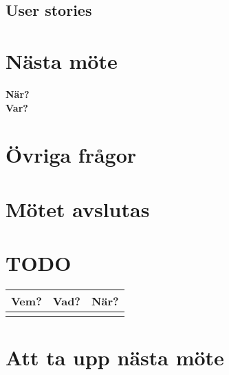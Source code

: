 \documentclass[9pt]{article}
\begin{document}
\subsection{User stories}

\section{Nästa möte}
\textbf{När?} \\
\textbf{Var?} \\

\section{Övriga frågor}

\section{Mötet avslutas}


\appendix
\section{TODO}
\begin{tabular}{| p{3cm} | p{7.5cm} | p{3cm}|}
  \hline
  \textbf{Vem?} & \textbf{Vad?} & \textbf{När?} \\ \hline
  \textbf{} & \textbf{} & \textbf{} \\ \hline


  \end{tabular}
\section{Att ta upp nästa möte}
\end{document}
